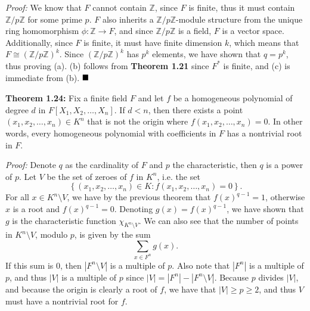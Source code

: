\documentclass[12pt]{article}
\newcommand{\Z}{\ensuremath{\mathbb{Z}}}
\newcommand{\braceb}[1]{\left\{#1\right\}}
\newcommand{\vertb}[1]{\left\vert#1\right\vert}
\newcommand{\sdiff}{\setminus}
\newcommand{\proof}{\textit{Proof: }}
\newcommand{\done}{\ensuremath{\strut\hfill\blacksquare}}
\begin{document}
\proof
We know that \( F \) cannot contain \( \Z \), since \( F \) is finite, thus
it must contain \( \Z/p\Z \) for some prime \( p \).
\( F \) also inherits a \( \Z/p\Z \)-module structure from the unique ring
homomorphism \( \phi : \Z \to F \), and since \( \Z/p\Z \) is a field, \( F \)
is a vector space.
Additionally, since \( F \) is finite, it must have finite dimension \( k \),
which means that \( F \cong (\Z/p\Z)^k \).
Since \( (\Z/p\Z)^k \) has \( p^k \) elements, we have shown that
\( q = p^k \), thus proving (a).
(b) follows from \textbf{Theorem 1.21} since \( F^* \) is finite, and (c)
is immediate from (b).
\done

\textbf{Theorem 1.24:}
Fix a finite field \( F \) and let \( f \) be a homogeneous polynomial of
degree \( d \) in \( F[X_1, X_2, \dots, X_n] \).
If \( d < n \), then there exists a point \( (x_1, x_2, \dots, x_n) \in K^n \)
that is not the origin where \( f(x_1, x_2, \dots, x_n) = 0 \).
In other words, every homogeneous polynomial with coefficients in \( F \) has
a nontrivial root in \( F \).

\proof
Denote \( q \) as the cardinality of \( F \) and \( p \) the characteristic,
then \( q \) is a power of \( p \).
Let \( V \) be the set of zeroes of \( f \) in \( K^n \), i.e. the set
\[
	\braceb{(x_1, x_2, \dots, x_n) \in K : f(x_1, x_2, \dots, x_n) = 0}.
\]
For all \( x \in K^n \sdiff V \), we have by the previous theorem that
\( f(x)^{q - 1} = 1 \), otherwise \( x \) is a root and \( f(x)^{q - 1} = 0 \).
Denoting \( g(x) = f(x)^{q - 1} \), we have shown that \( g \) is the
characteristic function \( \chi_{K^n \sdiff V} \).
We can also see that the number of points in \( K^n \sdiff V \), modulo
\( p \), is given by the sum
\begin{equation}
	\sum_{x \in F^n} g(x).
\end{equation}
If this sum is 0, then \( \vertb{F^n \sdiff V} \) is a multiple of \( p \).
Also note that \( \vertb{F^n} \) is a multiple of \( p \), and thus
\( \vertb{V} \) is a multiple of \( p \) since
\( \vertb{V} = \vertb{F^n} - \vertb{F^n \sdiff V} \).
Because \( p \) divides \( \vertb{V} \), and because the origin is clearly a
root of \( f \), we have that \( \vertb{V} \geq p \geq 2 \), and thus
\( V \) must have a nontrivial root for \( f \).
\end{document}
